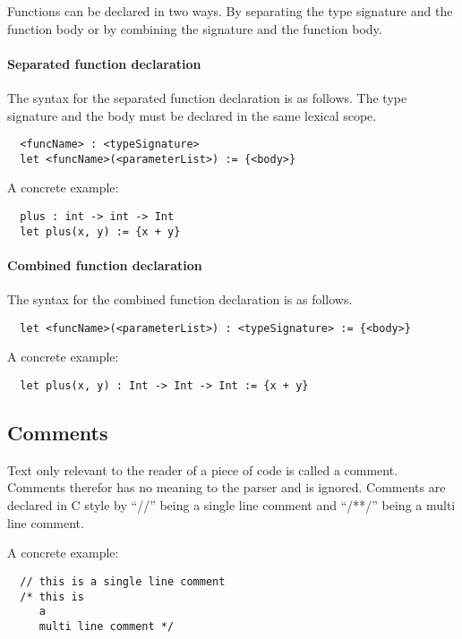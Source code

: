 Functions can be declared in two ways. By separating the type signature and the function body or by combining the signature and the function body.

\paragraph{Separated function declaration}

The syntax for the separated function declaration is as follows. The type signature and the body must be declared in the same lexical scope.

\begin{verbatim}
  <funcName> : <typeSignature>
  let <funcName>(<parameterList>) := {<body>}
\end{verbatim}

A concrete example:

\begin{verbatim}
  plus : int -> int -> Int
  let plus(x, y) := {x + y}
\end{verbatim}


\paragraph{Combined function declaration}

The syntax for the combined function declaration is as follows.

\begin{verbatim}
  let <funcName>(<parameterList>) : <typeSignature> := {<body>}
\end{verbatim}

A concrete example:

\begin{verbatim}
  let plus(x, y) : Int -> Int -> Int := {x + y}
\end{verbatim}

\subsection{Comments}
\label{sec:comments}

Text only relevant to the reader of a piece of code is called a comment. Comments therefor has no meaning to the parser and is ignored. Comments are declared in C style by \enquote{//} being a single line comment and \enquote{/**/} being a multi line comment.

A concrete example:

\begin{verbatim}
  // this is a single line comment
  /* this is
     a
     multi line comment */
\end{verbatim}

